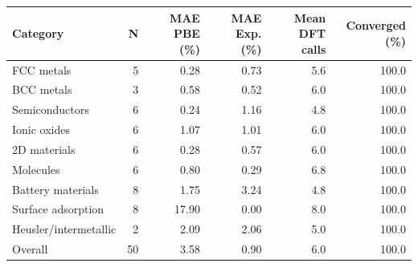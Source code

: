\begin{tabular}{lrrrrr}
\toprule
Category & N & MAE PBE (\%) & MAE Exp. (\%) & Mean DFT calls & Converged (\%) \\
\midrule
FCC metals & 5 & 0.28 & 0.73 & 5.6 & 100.0 \\
BCC metals & 3 & 0.58 & 0.52 & 6.0 & 100.0 \\
Semiconductors & 6 & 0.24 & 1.16 & 4.8 & 100.0 \\
Ionic oxides & 6 & 1.07 & 1.01 & 6.0 & 100.0 \\
2D materials & 6 & 0.28 & 0.57 & 6.0 & 100.0 \\
Molecules & 6 & 0.80 & 0.29 & 6.8 & 100.0 \\
Battery materials & 8 & 1.75 & 3.24 & 4.8 & 100.0 \\
Surface adsorption & 8 & 17.90 & 0.00 & 8.0 & 100.0 \\
Heusler/intermetallic & 2 & 2.09 & 2.06 & 5.0 & 100.0 \\
Overall & 50 & 3.58 & 0.90 & 6.0 & 100.0 \\
\bottomrule
\end{tabular}